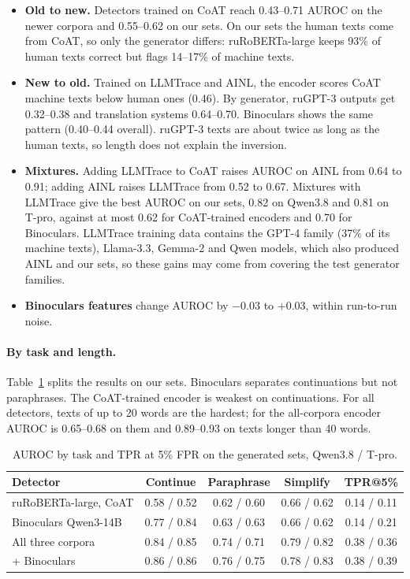 \documentclass{article}
\begin{document}
\begin{itemize}
    \item \textbf{Old to new.} Detectors trained on CoAT reach 0.43--0.71 AUROC on the newer corpora and
    0.55--0.62 on our sets. On our sets the human texts come from CoAT, so only the generator differs:
    ruRoBERTa-large keeps 93\% of human texts correct but flags 14--17\% of machine texts.
    \item \textbf{New to old.} Trained on LLMTrace and AINL, the encoder scores CoAT machine texts below human
    ones (0.46). By generator, ruGPT-3 outputs get 0.32--0.38 and translation systems 0.64--0.70. Binoculars shows
    the same pattern (0.40--0.44 overall). ruGPT-3 texts are about twice as long as the human texts, so length
    does not explain the inversion.
    \item \textbf{Mixtures.} Adding LLMTrace to CoAT raises AUROC on AINL from 0.64 to 0.91; adding AINL raises
    LLMTrace from 0.52 to 0.67. Mixtures with LLMTrace give the best AUROC on our sets, 0.82 on Qwen3.8 and 0.81
on T-pro, against at most 0.62 for CoAT-trained encoders and 0.70 for Binoculars. LLMTrace training data
    contains the GPT-4 family (37\% of its machine texts), Llama-3.3, Gemma-2 and Qwen models, which also produced
    AINL and our sets, so these gains may come from covering the test generator families.
    \item \textbf{Binoculars features} change AUROC by $-0.03$ to $+0.03$, within run-to-run noise.
\end{itemize}

\paragraph{By task and length.} Table~\ref{tab:tasks} splits the results on our sets. Binoculars separates
continuations but not paraphrases. The CoAT-trained encoder is weakest on continuations. For all detectors, texts
of up to 20 words are the hardest; for the all-corpora encoder AUROC is 0.65--0.68 on them and 0.89--0.93 on
texts longer than 40 words.

\begin{table}[tbh!]
\begin{center}
\small
\begin{tabular}{|l|ccc|c|}
\hline
Detector & Continue & Paraphrase & Simplify & TPR@5\% \\
\hline
ruRoBERTa-large, CoAT & 0.58 / 0.52 & 0.62 / 0.60 & 0.66 / 0.62 & 0.14 / 0.11 \\
Binoculars Qwen3-14B & 0.77 / 0.84 & 0.63 / 0.63 & 0.66 / 0.62 & 0.14 / 0.21 \\
All three corpora & 0.84 / 0.85 & 0.74 / 0.71 & 0.79 / 0.82 & 0.38 / 0.36 \\
\quad + Binoculars & 0.86 / 0.86 & 0.76 / 0.75 & 0.78 / 0.83 & 0.38 / 0.39 \\
\hline
\end{tabular}
\caption{AUROC by task and TPR at 5\% FPR on the generated sets, Qwen3.8 / T-pro.}
\label{tab:tasks}
\end{center}
\end{table}
\end{document}
